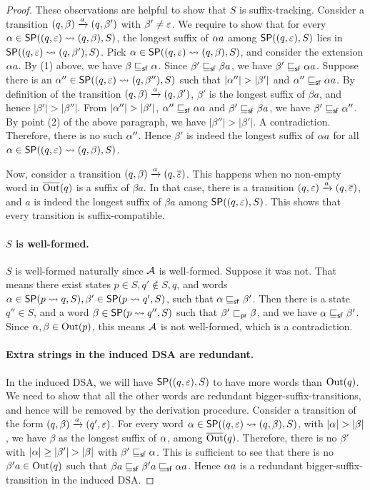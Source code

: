 \begin{proof}
  These observations are helpful to show that $S$ is
  suffix-tracking. Consider a transition $(q, \beta) \xrightarrow{a} (q,
  \beta')$ with $\beta' \neq \varepsilon$. We require to show that for every
  $\alpha \in \mathsf{SP}((q, \varepsilon) \rightsquigarrow (q, \beta), S)$, the longest suffix of $\alpha
  a$ among $\mathsf{SP}((q, \varepsilon), S)$ lies in $\mathsf{SP}((q, \varepsilon) \rightsquigarrow (q,
    \beta'), S)$. Pick $\alpha \in \mathsf{SP}((q, \varepsilon) \rightsquigarrow (q, \beta), S)$, and
  consider the extension $\alpha a$. By (1) above, we have $\beta \sqsubseteq_{\mathsf {sf}}
  \alpha$. Since $\beta' \sqsubseteq_{\mathsf {sf}} \beta a$, we have $\beta' \sqsubseteq_{\mathsf {sf}} \alpha
  a$. Suppose there is an $\alpha'' \in \mathsf{SP}((q, \varepsilon) \rightsquigarrow (q, \beta''), S)$
  such that $|\alpha''| > |\beta'|$ and $\alpha'' \sqsubseteq_{\mathsf {sf}} \alpha a$. By definition of
  the transition $(q, \beta) \xrightarrow{a} (q,
  \beta')$, $\beta'$ is the longest suffix of $\beta a$, and hence
  $|\beta'| > |\beta''|$. From $|\alpha''| > |\beta'|$, $\alpha'' \sqsubseteq_{\mathsf {sf}} \alpha a$
  and $\beta' \sqsubseteq_{\mathsf {sf}} \beta a$, we have $\beta' \sqsubseteq_{\mathsf {sf}} \alpha''$. By point (2)
  of the above paragraph,  we have $|\beta''| > |\beta'|$. A
  contradiction. Therefore, there is no such $\alpha''$. Hence $\beta'$ is
  indeed the longest suffix of $\alpha a$ for all $\alpha \in \mathsf{SP}((q,
    \varepsilon) \rightsquigarrow (q, \beta), S)$.

  Now, consider a transition $(q, \beta) \xrightarrow{a} (q,\overline{\varepsilon})$. This
  happens when no non-empty word in $\overline{\operatorname{Out}}(q)$ is a suffix of $\beta
  a$. In that case, there is a transition $(q, \varepsilon) \xrightarrow{a} (q,\overline{\varepsilon})$,
  and $a$ is indeed the longest suffix of $\beta a$ among $\mathsf{SP}((q,
    \varepsilon), S)$. This shows that every transition is suffix-compatible. 
 
	
  \paragraph*{$S$ is well-formed.} $S$ is well-formed naturally since $\mathcal{A}$ is well-formed. Suppose it
  was not. That means there exist states
  $p \in S, q' \notin S, q$, and words $\alpha \in \mathsf{SP}(p \rightsquigarrow q, S), \beta'
  \in \mathsf{SP}(p \rightsquigarrow q', S)$, such that $\alpha \sqsubseteq_{\mathsf {sf}} \beta'$. Then there is a state $q'' \in S$, and a word $\beta \in \mathsf{SP}(p \rightsquigarrow q'', S)$ such that
  $\beta' \sqsubset_{\mathsf {pr}} \beta$, and we have $\alpha \sqsubseteq_{\mathsf {sf}} \beta'$. Since
  $\alpha,\beta \in \operatorname{Out}(p)$, this means $\mathcal{A}$ is not well-formed, which is a
  contradiction.

  \paragraph*{Extra strings in the induced DSA are redundant.} In the induced DSA, we will have $\mathsf{SP}((q, \varepsilon), S)$ to have more
  words than $\operatorname{Out}(q)$. We need to show that all the other words are
  redundant bigger-suffix-transitions, and hence will be removed by the
  derivation procedure. Consider a transition of the form $(q, \beta)
  \xrightarrow{a} (q', \varepsilon)$. For every word $\alpha \in \mathsf{SP}((q, \varepsilon) \rightsquigarrow (q,
    \beta), S)$, with $|\alpha| > |\beta|$, we have $\beta$ as the longest
  suffix of $\alpha$, among $\overline{\operatorname{Out}}(q)$. Therefore, there is no $\beta'$
  with $|\alpha| \ge |\beta'| > |\beta|$ with $\beta' \sqsubseteq_{\mathsf {sf}} \alpha$. This is
  sufficient to see that there is no $\beta' a \in \operatorname{Out}(q)$ such that
  $\beta a \sqsubseteq_{\mathsf {sf}} \beta' a \sqsubseteq_{\mathsf {sf}} \alpha a$. Hence $\alpha a$ is a redundant
  bigger-suffix-transition in the induced DSA.


\end{proof}
